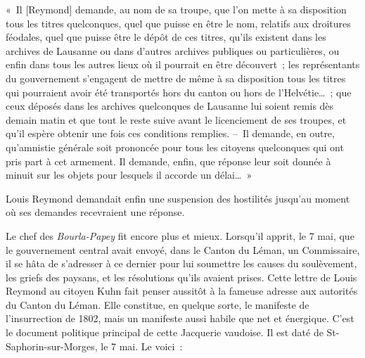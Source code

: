 \documentclass[french,twoside]{book} %
\newenvironment{quoteblock}%
  {\begin{quoting}}
  {\end{quoting}}
\newenvironment{quotebar}{%
    \def\FrameCommand{{\color{rubric!10!}\vrule width 0.5em} \hspace{0.9em}}%
    \def\OuterFrameSep{\itemsep} %
    \MakeFramed {\advance\hsize-\width \FrameRestore}
  }%
  {%
    \endMakeFramed
  }
\renewenvironment{quoteblock}%
  {%
    \savenotes
    \setstretch{0.9}
    \normalfont
    \begin{quotebar}
  }
  {%
    \end{quotebar}
    \spewnotes
  }
\begin{document}
\begin{quoteblock}
 \noindent « Il [Reymond] demande, au nom de sa troupe, que l’on mette à sa disposition tous les titres quelconques, quel que puisse en être le nom, relatifs aux droitures féodales, quel que puisse être le dépôt de ces titres, qu’ils existent dans les archives de Lausanne ou dans d’autres archives publiques ou particulières, ou enfin dans tous les autres lieux où il pourrait en être découvert ; les représentants du gouvernement s’engagent de mettre de même à sa disposition tous les titres qui pourraient avoir été transportés hors du canton ou hors de l’Helvétie… ; que ceux déposés dans les archives quelconques de Lausanne lui soient remis dès demain matin et que tout le reste suive avant le licenciement de ses troupes, et qu’il espère obtenir une fois ces conditions remplies. – Il demande, en outre, qu’amnistie générale soit prononcée pour tous les citoyens quelconques qui ont pris part à cet armement. Il demande, enfin, que réponse leur soit donnée à minuit sur les objets pour lesquels il accorde un délai… »
 \end{quoteblock}

\noindent Louis Reymond demandait enfin une suspension des hostilités jusqu’au moment où ses demandes recevraient une réponse.\par
Le chef des \emph{Bourla-Papey} fit encore plus et mieux. Lorsqu’il apprit, le 7 mai, que le gouvernement central avait envoyé, dans le Canton du Léman, un Commissaire, il se hâta de s’adresser à ce dernier pour lui soumettre les causes du soulèvement, les griefs des paysans, et les résolutions qu’ils avaient prises. Cette lettre de Louis Reymond au citoyen Kuhn fait penser aussitôt à la fameuse adresse aux autorités du Canton du Léman. Elle constitue, en quelque sorte, le manifeste de l’insurrection de 1802, mais un manifeste aussi habile que net et énergique. C’est le document politique principal de cette Jacquerie vaudoise. Il est daté de St-Saphorin-sur-Morges, le 7 mai. Le voici :\par
\end{document}

